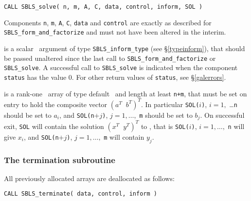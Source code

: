 \documentclass{galahad}
\newcommand{\packagename}{SBLS}
\begin{document}
\hspace{8mm}
{\tt CALL \packagename\_solve( n, m, A, C, data, control, inform, SOL )}
\vspace*{1mm}

\noindent
Components {\tt n}, {\tt m},  {\tt A}, {\tt C}, {\tt data} and
{\tt control} are exactly as described for
{\tt \packagename\_form\_and\_factorize} and must not have been
altered in the interim.

\vspace*{-3mm}
\begin{description}

 is a scalar \intentout\ argument of type
{\tt \packagename\_inform\_type}
(see \S\ref{typeinform}), that should be passed unaltered since
the last call to {\tt \packagename\_form\_and\_factorize} or
{\tt \packagename\_solve}.  A successful call to
{\tt \packagename\_solve}
is indicated when the  component {\tt status} has the value 0.
For other return values of {\tt status}, see \S\ref{galerrors}.

 is a rank-one  \intentinout\ array of type default \real\
and length at least {\tt n+m}, that must be set on entry to hold
the composite vector $( a^T \;\; b^T)^T$.
In particular {\tt SOL(}$i${\tt )}, $i = 1,$ \ldots {\tt n} should be
set to $a_i$, and
{\tt SOL(n}$+j${\tt )}, $j = 1, \ldots,$ {\tt m} should be
set to $b_j$. On successful exit, {\tt SOL}
will contain the solution $( x^T \;\; y^T)^T$ to , that is
{\tt SOL(}$i${\tt )}, $i = 1, \ldots,$ {\tt n} will give
$x_i$, and  {\tt SOL(n}$+j${\tt )}, $j = 1,\ldots,$ {\tt m} will contain
$y_j$.



\end{description}


\subsubsection{The  termination subroutine}
All previously allocated arrays are deallocated as follows:
\vspace*{1mm}

\hspace{8mm}
{\tt CALL \packagename\_terminate( data, control, inform )}
\end{document}
